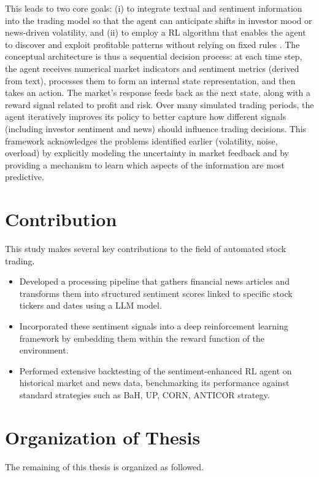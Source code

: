 This leads to two core goals: (i) to integrate textual and sentiment information into the trading model so that the agent can anticipate shifts in investor mood or news-driven volatility, and (ii) to employ a \gls{RL} algorithm that enables the agent to discover and exploit profitable patterns without relying on fixed rules \cite{Nevmyvaka2006}. The conceptual architecture is thus a sequential decision process: at each time step, the agent receives numerical market indicators and sentiment metrics (derived from text), processes them to form an internal state representation, and then takes an action. The market's response feeds back as the next state, along with a reward signal related to profit and risk. Over many simulated trading periods, the agent iteratively improves its policy to better capture how different signals (including investor sentiment and news) should influence trading decisions. This framework acknowledges the problems identified earlier (volatility, noise, overload) by explicitly modeling the uncertainty in market feedback and by providing a mechanism to learn which aspects of the information are most predictive.

\section{Contribution}
\label{sec:contribution}
This study makes several key contributions to the field of automated stock trading.

\begin{itemize}
  \item Developed a processing pipeline that gathers financial news articles and transforms them into structured sentiment scores linked to specific stock tickers and dates using a \gls{LLM} model.
  \item Incorporated these sentiment signals into a deep reinforcement learning framework by embedding them within the reward function of the environment.
  \item Performed extensive backtesting of the sentiment-enhanced RL agent on historical market and news data, benchmarking its performance against standard strategies such as \gls{BaH}, \gls{UP}, \gls{CORN}, \gls{ANTICOR} strategy.
\end{itemize}

\section{Organization of Thesis}
The remaining of this thesis is organized as followed.

